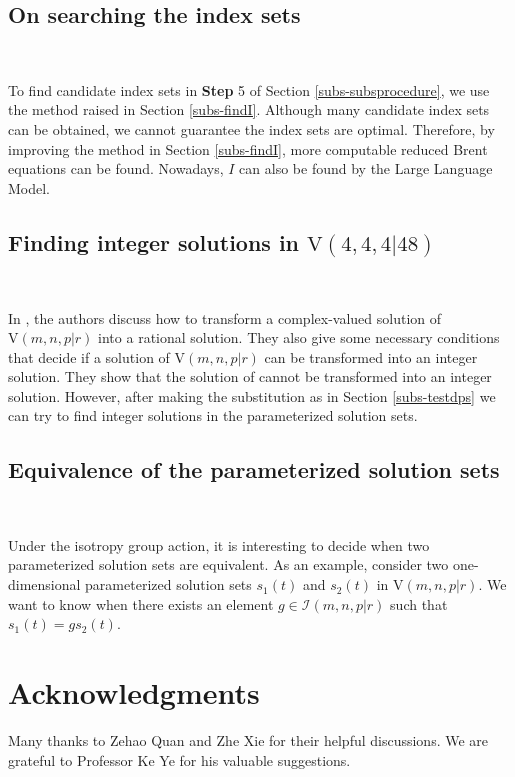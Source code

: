 \documentclass[reqno]{amsart}
\theoremstyle{definition}
\numberwithin{equation}{section}
\theoremstyle{remark}
\newcounter{condition}
\begin{document}
\subsection{On searching the index sets}
\

To find candidate index sets in \textbf{Step} 5 of Section \ref{subs-subsprocedure}, we use the method raised in Section \ref{subs-findI}. Although many candidate index sets can be obtained,  
we cannot guarantee the index sets are optimal. Therefore, by improving the method in Section \ref{subs-findI}, more computable reduced Brent equations can be found. Nowadays, $I$ can also be found by the Large Language Model.

\subsection{Finding integer solutions in $\mathrm{V}(4,4,4|48)$}
\

In \cite{moran26}, the authors discuss how to transform a complex-valued solution of $\mathrm{V}(m,n,p|r)$ into a rational solution. They also give some necessary conditions that decide if a solution of $\mathrm{V}(m,n,p|r)$ can be transformed into an integer solution. They show that the solution
of \cite{dumas25} cannot be transformed into an integer solution. However, after making the substitution as in Section \ref{subs-testdps} we can try to find integer solutions in the parameterized solution sets.

\subsection{Equivalence of the parameterized solution sets}
\

Under the isotropy group action, it is interesting to decide when two parameterized solution sets are equivalent.  As an example, consider two one-dimensional parameterized solution sets $s_1(t)$ and $s_2(t)$ in $\mathrm{V}(m,n,p|r)$. We want to know when there exists an element $g\in \mathcal{I}(m,n,p|r)$ such that $s_1(t)=gs_2(t)$.


\section*{Acknowledgments}
Many thanks to Zehao Quan and Zhe Xie for their helpful discussions. We are grateful to Professor Ke Ye for his valuable suggestions.
\end{document}
